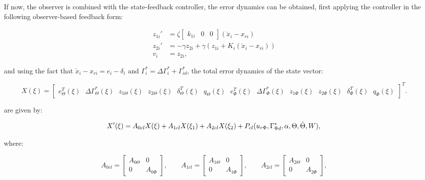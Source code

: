 \documentclass[main.tex]{subfiles}
\begin{document}
	If now, the observer is combined with the state-feedback controller, the error dynamics can be obtained, first applying the controller in the following observer-based feedback form:
	
		\begin{align}
		z_{1i}' &= \zeta \begin{bmatrix} 
		k_{1i} & 0 & 0
		\end{bmatrix}(\check{x}_i - x_{ri}) \label{eq:controllerlowpasserror}\\
		z_{2i}' &= -\gamma z_{2i}  + \gamma (z_{1i} + K_i(\check{x}_i - x_{ri})) \label{eq:controllerintegralerror}\\
		v_i &= z_{2i} \label{eq:controllerfeedbackerror},
		\end{align}
	
	and using the fact that $\check{x}_i - x_{ri} = e_i - \delta_i$ and $\Gamma_i^* = \Delta \Gamma_i^* + \Gamma_{id}^*$, the total error dynamics of the state vector:
	
	\begin{equation}
	X(\xi) = \begin{bmatrix} 
	e_{\Theta}^T(\xi) \text{ }\Delta \Gamma_\Theta^{*}(\xi) \text{ }z_{1\Theta}(\xi) \text{ } z_{2\Theta}(\xi) \text{ }\delta_{\Theta}^T(\xi) \text{ } q_\Theta(\xi) \text{ }e_{\Phi}^T(\xi) \text{ }\Delta \Gamma_\Phi^*(\xi) \text{ }z_{1\Phi}(\xi) \text{ }z_{2\Phi}(\xi) \text{ }\delta_{\Phi}^T(\xi) \text{ }q_\Phi(\xi)  \nonumber
	\end{bmatrix}^T.
	\end{equation}
	
	are given by:
	
	\begin{equation}
	X'(\xi) =	A_{0cl}X(\xi) + A_{1cl}X(\xi_1) + A_{2cl} X(\xi_2) + P_{cl}(u_{r\Phi},\Gamma_{\Phi d}^*,\alpha, \Theta,\check{\Theta},W),\\
	\label{eq:totaldynamics}
	\end{equation}	
	
	where:

	\begin{equation}
	A_{0cl} = 
	\begin{bmatrix}
	A_{0\Theta} & 0 \\
	0 & A_{0\Phi}
	\end{bmatrix}, \qquad
	A_{1cl} =
	\begin{bmatrix}
	A_{1\Theta} & 0 \\
	0 & A_{1\Phi}
	\end{bmatrix}, \qquad
	A_{2cl} =
	\begin{bmatrix}
	A_{2\Theta} & 0 \\
	0 & A_{2\Phi}
	\end{bmatrix},
	\label{eq:ClosedLoopMatrices}
	\end{equation}
	
\end{document}
